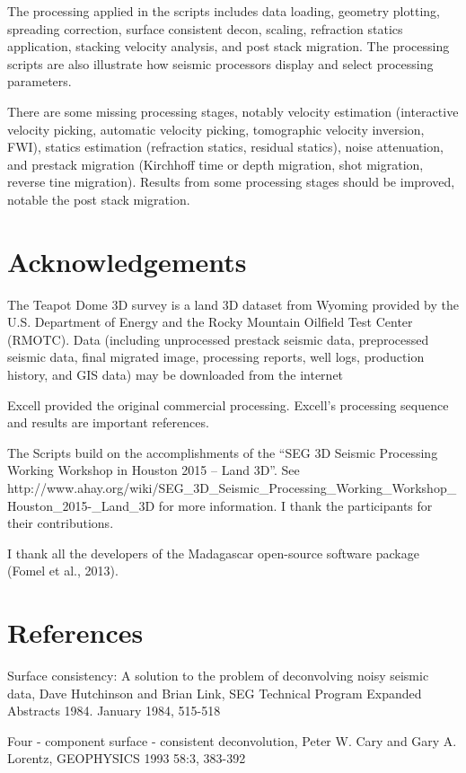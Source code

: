 The processing applied in the scripts includes data loading, geometry plotting, spreading correction, surface consistent decon, scaling, refraction statics application, stacking velocity analysis, and post stack migration.  The processing scripts are also illustrate how seismic processors display and select processing parameters. 

There are some missing processing stages, notably velocity estimation (interactive velocity picking, automatic velocity picking, tomographic velocity inversion, FWI), statics estimation (refraction statics, residual statics), noise attenuation, and prestack migration (Kirchhoff time or depth migration, shot migration, reverse tine migration).  Results from some processing stages should be improved, notable the post stack migration.

\section{Acknowledgements} 

The Teapot Dome 3D survey is a land 3D dataset from Wyoming provided by the U.S. Department of Energy and the Rocky Mountain Oilfield Test Center (RMOTC).  Data (including unprocessed prestack seismic data, preprocessed seismic data, final migrated image, processing reports, well logs, production history, and GIS data) may be downloaded from the internet

Excell provided the original commercial processing.  Excell’s processing sequence and results are important references.

The Scripts build on the accomplishments of the “SEG 3D Seismic Processing Working Workshop in Houston 2015 – Land 3D”.  See http://www.ahay.org/wiki/SEG\_3D\_Seismic\_Processing\_Working\_Workshop\_Houston\_2015-\_Land\_3D for more information.  I thank the participants for their contributions.

I thank all the developers of the Madagascar open-source software package (Fomel et al., 2013).

\section{References}

Surface consistency: A solution to the problem of deconvolving noisy seismic data,  Dave Hutchinson and Brian Link, SEG Technical Program Expanded Abstracts 1984. January 1984, 515-518 

Four - component surface - consistent deconvolution, Peter W. Cary and Gary A. Lorentz, GEOPHYSICS 1993 58:3, 383-392 


